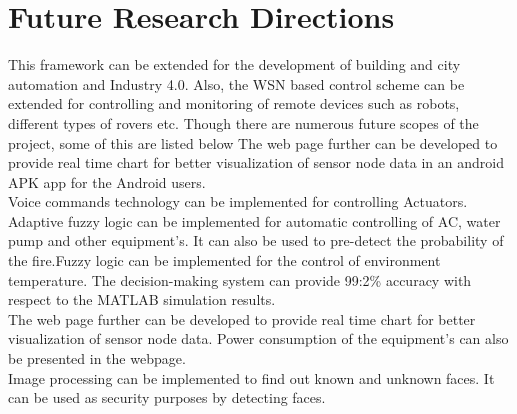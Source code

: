 \section{Future Research Directions}
This framework can be extended for the development of building and city automation and Industry 4.0. Also, the WSN based control scheme can be extended for controlling and monitoring of remote devices such as robots, different types of rovers etc. Though there are numerous future scopes of the project, some of this are listed below
The web page further can be developed to provide real time chart for better visualization of sensor node data in an android APK app for the Android users.\\
Voice commands technology can be implemented for controlling Actuators.\\
Adaptive fuzzy logic can be implemented for automatic controlling of AC, water pump and other equipment’s. It can also be used to pre-detect the probability of the fire.Fuzzy logic can be  implemented for the control of environment temperature. The decision-making system can provide 99:2\% accuracy with respect to the MATLAB simulation results.\\
The web page further can be developed to provide real time chart for better visualization of sensor node data. Power consumption of the equipment’s can also be presented in the webpage.\\
Image processing can be implemented to find out known and unknown faces. It can be used as security purposes by detecting faces.
